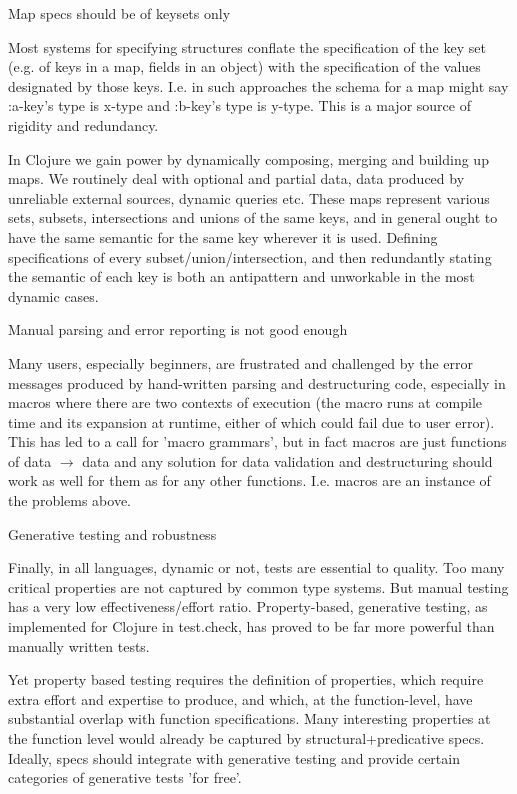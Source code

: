 Map specs should be of keysets only

Most systems for specifying structures conflate the specification of the key set
(e.g. of keys in a map, fields in an object) with the specification of the
values designated by those keys. I.e. in such approaches the schema for a map
might say :a-key’s type is x-type and :b-key’s type is y-type. This is a major
source of rigidity and redundancy.

In Clojure we gain power by dynamically composing, merging and building up maps.
We routinely deal with optional and partial data, data produced by unreliable
external sources, dynamic queries etc. These maps represent various sets,
subsets, intersections and unions of the same keys, and in general ought to have
the same semantic for the same key wherever it is used. Defining specifications
of every subset/union/intersection, and then redundantly stating the semantic of
each key is both an antipattern and unworkable in the most dynamic cases.

Manual parsing and error reporting is not good enough

Many users, especially beginners, are frustrated and challenged by the error
messages produced by hand-written parsing and destructuring code, especially in
macros where there are two contexts of execution (the macro runs at compile time
and its expansion at runtime, either of which could fail due to user error).
This has led to a call for 'macro grammars', but in fact macros are just
functions of data $\rightarrow$ data and any solution for data validation and destructuring
should work as well for them as for any other functions. I.e. macros are an
instance of the problems above.

Generative testing and robustness

Finally, in all languages, dynamic or not, tests are essential to quality. Too
many critical properties are not captured by common type systems. But manual
testing has a very low effectiveness/effort ratio. Property-based, generative
testing, as implemented for Clojure in test.check, has proved to be far more
powerful than manually written tests.

Yet property based testing requires the definition of properties, which require
extra effort and expertise to produce, and which, at the function-level, have
substantial overlap with function specifications. Many interesting properties at
the function level would already be captured by structural+predicative specs.
Ideally, specs should integrate with generative testing and provide certain
categories of generative tests 'for free'.

